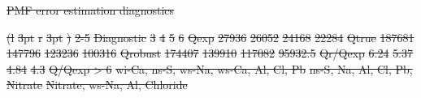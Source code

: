 \documentclass[
  letterpaper,
  DIV=11,
  numbers=noendperiod]{scrartcl}
\makeatletter
\renewenvironment{table}%
   {\renewcommand\familydefault\sfdefault
    \@float{table}}
   {\end@float}
\providecommand{\DIFadd}[1]{{\protect\color{blue}\underline{#1}}} %
\providecommand{\DIFdel}[1]{{\protect\color{red}\sout{#1}}}                      %
\providecommand{\DIFdelbegin}{} %
\providecommand{\DIFdelend}{} %
\providecommand{\DIFaddFL}[1]{\DIFadd{#1}} %
\providecommand{\DIFdelFL}[1]{\DIFdel{#1}} %
\providecommand{\DIFaddbeginFL}{} %
\providecommand{\DIFaddendFL}{} %
\providecommand{\DIFdelbeginFL}{} %
\providecommand{\DIFdelendFL}{} %
\newcommand{\DIFscaledelfig}{0.5}
\newlength{\DIFdelgraphicswidth} %
\newlength{\DIFdelgraphicsheight} %
\newcommand{\DIFaddincludegraphics}[2][]{{\color{blue}\fbox{\DIFOincludegraphics[#1]{#2}}}} %
\newcommand{\DIFdelincludegraphics}[2][]{%
\sbox{\DIFdelgraphicsbox}{\DIFOincludegraphics[#1]{#2}}%
\settoboxwidth{\DIFdelgraphicswidth}{\DIFdelgraphicsbox} %
\settoboxtotalheight{\DIFdelgraphicsheight}{\DIFdelgraphicsbox} %
\scalebox{\DIFscaledelfig}{%
\parbox[b]{\DIFdelgraphicswidth}{\usebox{\DIFdelgraphicsbox}\\[-\baselineskip] \rule{\DIFdelgraphicswidth}{0em}}\llap{\resizebox{\DIFdelgraphicswidth}{\DIFdelgraphicsheight}{%
\setlength{\unitlength}{\DIFdelgraphicswidth}%
\begin{picture}(1,1)%
\thicklines\linethickness{2pt} %
{\color[rgb]{1,0,0}\put(0,0){\framebox(1,1){}}}%
{\color[rgb]{1,0,0}\put(0,0){\line( 1,1){1}}}%
{\color[rgb]{1,0,0}\put(0,1){\line(1,-1){1}}}%
\end{picture}%
}\hspace*{3pt}}} %
} %
\DeclareRobustCommand{\DIFdelbegin}{\DIFOdelbegin \let\includegraphics\DIFdelincludegraphics} %
\DeclareRobustCommand{\DIFdelend}{\DIFOaddend \let\includegraphics\DIFOincludegraphics} %
\DeclareRobustCommand{\DIFaddbeginFL}{\DIFOaddbeginFL \let\includegraphics\DIFaddincludegraphics} %
\DeclareRobustCommand{\DIFaddendFL}{\DIFOaddendFL \let\includegraphics\DIFOincludegraphics} %
\DeclareRobustCommand{\DIFdelbeginFL}{\DIFOdelbeginFL \let\includegraphics\DIFdelincludegraphics} %
\DeclareRobustCommand{\DIFdelendFL}{\DIFOaddendFL \let\includegraphics\DIFOincludegraphics} %
\makeatother
\begin{document}
\DIFdelbegin %
\DIFdelend \begin{table}
\DIFdelbeginFL %
{%
\DIFdelFL{PMF error estimation diagnostics }}%
\DIFdelendFL 

\DIFdelbeginFL %
\DIFdelendFL \DIFaddbeginFL \caption{\label{tbl-pmf}\DIFaddFL{PMF error estimation diagnostics.}}
\DIFaddendFL 

\DIFdelbeginFL %
\DIFdelFL{(l}%
\DIFdelFL{3pt}%
\DIFdelFL{r}%
\DIFdelFL{3pt}%
\DIFdelFL{)}%
\DIFdelFL{2-5}%
\DIFdelFL{Diagnostic }%
\DIFdelFL{3 }%
\DIFdelFL{4 }%
\DIFdelFL{5 }%
\DIFdelFL{6}%
\DIFdelFL{Qexp }%
\DIFdelFL{27936 }%
\DIFdelFL{26052 }%
\DIFdelFL{24168 }%
\DIFdelFL{22284}%
\DIFdelFL{Qtrue }%
\DIFdelFL{187681 }%
\DIFdelFL{147796 }%
\DIFdelFL{123236 }%
\DIFdelFL{100316}%
\DIFdelFL{Qrobust }%
\DIFdelFL{174407 }%
\DIFdelFL{139910 }%
\DIFdelFL{117082 }%
\DIFdelFL{95932.5}%
\DIFdelFL{Qr/Qexp }%
\DIFdelFL{6.24 }%
\DIFdelFL{5.37 }%
\DIFdelFL{4.84 }%
\DIFdelFL{4.3}%
\DIFdelFL{Q/Qexp > 6 }%
\DIFdelFL{wi-Ca, ns-S, ws-Na, ws-Ca, Al, Cl, Pb }%
\DIFdelFL{ns-S, Na, Al, Cl, Pb, Nitrate }%
\DIFdelFL{Nitrate, ws-Na, Al, Chloride }%

\end{table}
\end{document}
